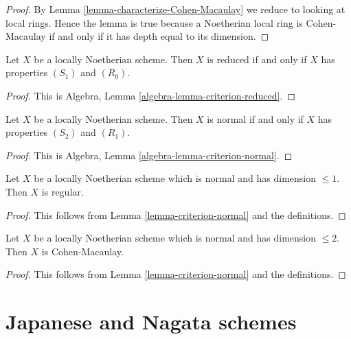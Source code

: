 \begin{proof}
By Lemma \ref{lemma-characterize-Cohen-Macaulay}
we reduce to looking at local rings.
Hence the lemma is true because a Noetherian local ring is Cohen-Macaulay
if and only if it has depth equal to its dimension.
\end{proof}

\begin{lemma}
\label{lemma-criterion-reduced}
Let $X$ be a locally Noetherian scheme.
Then $X$ is reduced if and only if $X$ has properties $(S_1)$ and $(R_0)$.
\end{lemma}

\begin{proof}
This is Algebra, Lemma \ref{algebra-lemma-criterion-reduced}.
\end{proof}

\begin{lemma}
\label{lemma-criterion-normal}
Let $X$ be a locally Noetherian scheme.
Then $X$ is normal if and only if $X$ has properties $(S_2)$ and $(R_1)$.
\end{lemma}

\begin{proof}
This is Algebra, Lemma \ref{algebra-lemma-criterion-normal}.
\end{proof}

\begin{lemma}
\label{lemma-normal-dimension-1-regular}
Let $X$ be a locally Noetherian scheme which is normal and
has dimension $\leq 1$. Then $X$ is regular.
\end{lemma}

\begin{proof}
This follows from Lemma \ref{lemma-criterion-normal} and the definitions.
\end{proof}

\begin{lemma}
\label{lemma-normal-dimension-2-Cohen-Macaulay}
Let $X$ be a locally Noetherian scheme which is normal and
has dimension $\leq 2$. Then $X$ is Cohen-Macaulay.
\end{lemma}

\begin{proof}
This follows from Lemma \ref{lemma-criterion-normal} and the definitions.
\end{proof}







\section{Japanese and Nagata schemes}
\label{section-nagata}

